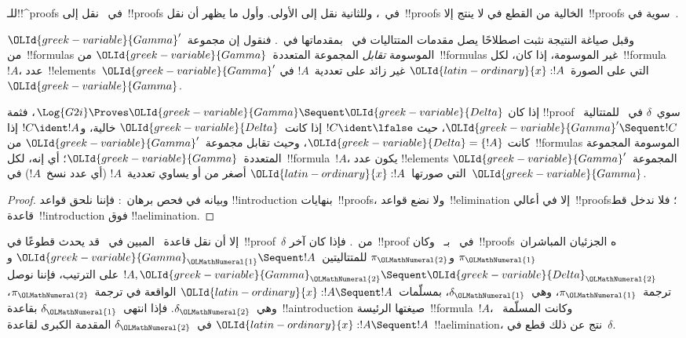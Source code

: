 \documentclass[../../../include/open-logic-section]{subfiles}
\begin{document}


للـ!!^{proof}s في~ نقل إلى~!!{proof}s في~، وللثانية
نقل إلى الأولى. وأول ما يظهر أن نقل~!!{proof}s الخالية من القطع في
 لا ينتج إلا~!!{proof}s سوية في~.

وقبل صياغة النتيجة نثبت اصطلاحًا يصل مقدمات المتتاليات في~
بمقدماتها في~. فنقول إن مجموعة~$\OLId{greek-variable}{Gamma}'$ من~!!{formula}s
الموسومة \emph{تقابل} المجموعة المتعددة~$\OLId{greek-variable}{Gamma}$ من~!!{formula}s غير
الموسومة، إذا كان، لكل~!!{formula}~$!A$، عدد~!!{element}s~$\OLId{greek-variable}{Gamma}'$ التي
على الصورة~$\OLId{latin-ordinary}{x}:!A$ غير زائد على تعددية~$!A$ في~$\OLId{greek-variable}{Gamma}$.

\begin{cor}
إذا كان $\Log{G2i} \Proves \OLId{greek-variable}{Gamma} \Sequent \OLId{greek-variable}{Delta}$، فثمة
!!{proof} سوي~$\delta$ في~ للمتتالية~$\OLId{greek-variable}{Gamma}' \Sequent !C$، حيث
$!C\ident\lfalse$ إذا كانت~$\OLId{greek-variable}{Delta}$ خالية، و$!C\ident !A$ إذا كانت
$\OLId{greek-variable}{Delta}=\{!A\}$، وحيث تقابل مجموعة~$\OLId{greek-variable}{Gamma}'$ من~!!{formula}s الموسومة
المجموعة المتعددة~$\OLId{greek-variable}{Gamma}$؛ أي إنه، لكل~!!{formula}~$!A$، يكون عدد
!!{element}s المجموعة~$\OLId{greek-variable}{Gamma}'$ التي صورتها~$\OLId{latin-ordinary}{x}:!A$ أصغر من أو يساوي
تعددية~$!A$ (أي عدد نسخ~$!A$) في~$\OLId{greek-variable}{Gamma}$.
\end{cor}

\begin{proof}
وبيانه في فحص برهان~: فإننا نلحق قواعد
!!{introduction} بنهايات~!!{proof}s، ولا نضع قواعد~!!{elimination} إلا
في أعالي~!!{proof}s؛ فلا ندخل قط قاعدة~!!{introduction} فوق
!!a{elimination}.
\end{proof}

إلا أن نقل قاعدة~\Cut{} المبين في~
قد يحدث قطوعًا في~!!{proof}~$\delta$ من~. فإذا كان آخر~!!{proof}
في~ بـ~\Cut{} وكان~!!{proof}sه الجزئيان المباشران~$\pi_\OLMathNumeral{1}$ و$\pi_\OLMathNumeral{2}$
للمتتاليتين~$\OLId{greek-variable}{Gamma}_\OLMathNumeral{1} \Sequent !A$ و
$!A,\OLId{greek-variable}{Gamma}_\OLMathNumeral{2} \Sequent \OLId{greek-variable}{Delta}_\OLMathNumeral{2}$ على الترتيب، فإننا نوصل ترجمة~$\pi_\OLMathNumeral{1}$،
وهي~$\delta_\OLMathNumeral{1}$، بمسلّمات~$\OLId{latin-ordinary}{x}:!A \Sequent !A$ الواقعة في ترجمة~$\pi_\OLMathNumeral{2}$،
وهي~$\delta_\OLMathNumeral{2}$. فإذا انتهى~$\delta_\OLMathNumeral{1}$ بقاعدة~!!a{introduction} صيغتها
الرئيسة~!!{formula}~$!A$، وكانت المسلّمة~$\OLId{latin-ordinary}{x}:!A \Sequent !A$ في~$\delta_\OLMathNumeral{2}$
المقدمة الكبرى لقاعدة~!!a{elimination}، نتج عن ذلك قطع في~$\delta$.
\end{document}
